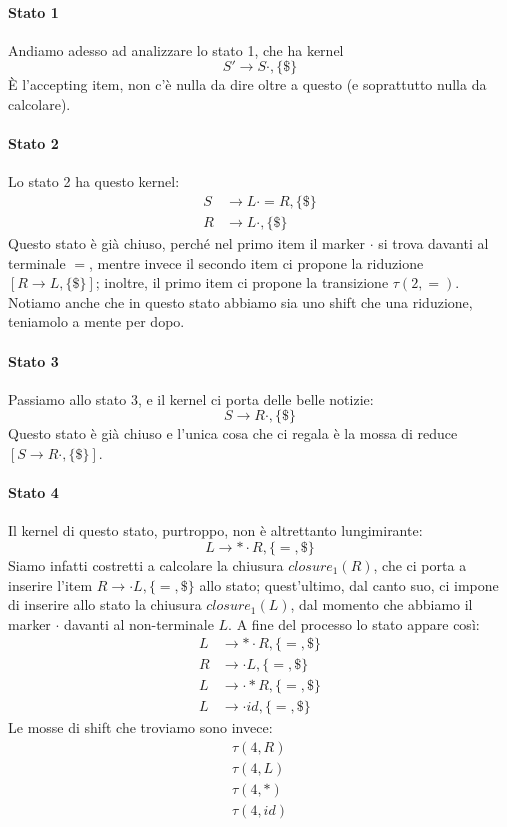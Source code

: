\documentclass[class=book, crop=false, oneside, 12pt]{standalone}
\begin{document}
\paragraph{Stato 1}
Andiamo adesso ad analizzare lo stato 1, che ha kernel 
\begin{equation*}
    S' \to S\cdot, \{\$\}    
\end{equation*}
È l'accepting item, non c'è nulla da dire oltre a questo (e soprattutto nulla da calcolare).

\paragraph{Stato 2}
Lo stato 2 ha questo kernel:
\begin{align*}
    S &\to L \cdot = R, \{\$\} \\
    R &\to L \cdot, \{\$\}
\end{align*}
Questo stato è già chiuso, perché nel primo item il marker \(\cdot\) si trova davanti al terminale \(=\), mentre invece il secondo item ci propone la riduzione \([R \to L, \{\$\}]\); inoltre, il primo item ci propone la transizione \(\tau(2, =)\). Notiamo anche che in questo stato abbiamo sia uno shift che una riduzione, teniamolo a mente per dopo.

\paragraph{Stato 3}
Passiamo allo stato 3, e il kernel ci porta delle belle notizie:
\begin{equation*}
    S \to R\cdot, \{\$\}    
\end{equation*}
Questo stato è già chiuso e l'unica cosa che ci regala è la mossa di reduce \([S \to R\cdot, \{\$\}]\).

\paragraph{Stato 4}
Il kernel di questo stato, purtroppo, non è altrettanto lungimirante:
\begin{equation*}
    L \to \ast \cdot R, \{=, \$\}
\end{equation*}
Siamo infatti costretti a calcolare la chiusura \(closure_1(R)\), che ci porta a inserire l'item \(R \to \cdot L, \{=, \$\}\) allo stato; quest'ultimo, dal canto suo, ci impone di inserire allo stato la chiusura \(closure_1(L)\), dal momento che abbiamo il marker \(\cdot\) davanti al non-terminale \(L\). A fine del processo lo stato appare così:
\begin{align*}
    L &\to \ast \cdot R, \{=, \$\} \\
    R &\to \cdot L, \{=, \$\} \\
    L &\to \cdot \ast R, \{=, \$\} \\
    L &\to \cdot id, \{=, \$\} 
\end{align*}
Le mosse di shift che troviamo sono invece:
\begin{gather*}
    \tau(4, R) \\
    \tau(4, L) \\
    \tau(4, \ast) \\
    \tau(4, id)
\end{gather*}
\end{document}
